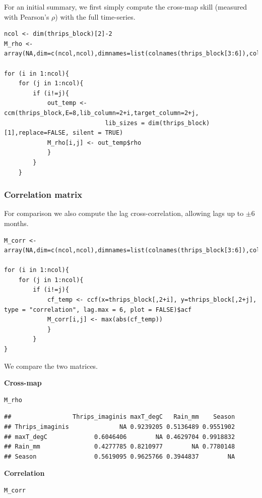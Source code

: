 For an initial summary, we first simply compute the cross-map skill (measured with Pearson's $\rho$) with the full time-series.

\begin{lstlisting}
ncol <- dim(thrips_block)[2]-2
M_rho <- array(NA,dim=c(ncol,ncol),dimnames=list(colnames(thrips_block[3:6]),colnames(thrips_block[3:6])))

for (i in 1:ncol){
    for (j in 1:ncol){
        if (i!=j){
            out_temp <- ccm(thrips_block,E=8,lib_column=2+i,target_column=2+j,
                            lib_sizes = dim(thrips_block)[1],replace=FALSE, silent = TRUE)
            M_rho[i,j] <- out_temp$rho
            } 
        }
    }
\end{lstlisting}

\subsubsection{Correlation matrix}

For comparison we also compute the lag cross-correlation, allowing lags up to $\pm 6$ months.
\begin{lstlisting}
M_corr <- array(NA,dim=c(ncol,ncol),dimnames=list(colnames(thrips_block[3:6]),colnames(thrips_block[3:6])))

for (i in 1:ncol){
    for (j in 1:ncol){
        if (i!=j){
            cf_temp <- ccf(x=thrips_block[,2+i], y=thrips_block[,2+j], type = "correlation", lag.max = 6, plot = FALSE)$acf
            M_corr[i,j] <- max(abs(cf_temp))
            }
        }
}
\end{lstlisting}

We compare the two matrices.

\textbf{Cross-map}
\begin{lstlisting}
M_rho
\end{lstlisting}

\begin{lstlisting}[backgroundcolor = \color{white}, commentstyle = \ttfamily]
##                 Thrips_imaginis maxT_degC   Rain_mm    Season
## Thrips_imaginis              NA 0.9239205 0.5136489 0.9551902
## maxT_degC             0.6046406        NA 0.4629704 0.9918832
## Rain_mm               0.4277785 0.8210977        NA 0.7780148
## Season                0.5619095 0.9625766 0.3944837        NA
\end{lstlisting}

\textbf{Correlation}
\begin{lstlisting}
M_corr
\end{lstlisting}

